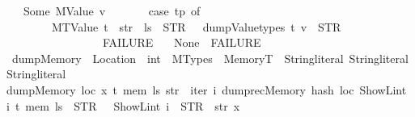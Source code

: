 \begin{isabellebody}
\ \ {\isacharbar}{\kern0pt}\ Some\ {\isacharparenleft}{\kern0pt}MValue\ v{\isacharparenright}{\kern0pt}\ {\isasymRightarrow}\isanewline
\ \ \ \ \ \ {\isacharparenleft}{\kern0pt}case\ tp\ of\isanewline
\ \ \ \ \ \ \ \ MTValue\ t\ {\isasymRightarrow}\ str\ {\isacharplus}{\kern0pt}\ ls\ {\isacharplus}{\kern0pt}\ {\isacharparenleft}{\kern0pt}STR\ {\isacharprime}{\kern0pt}{\isacharprime}{\kern0pt}{\isacharequal}{\kern0pt}{\isacharequal}{\kern0pt}{\isacharprime}{\kern0pt}{\isacharprime}{\kern0pt}{\isacharparenright}{\kern0pt}\ {\isacharplus}{\kern0pt}\ dump\isactrlsub V\isactrlsub a\isactrlsub l\isactrlsub u\isactrlsub e\isactrlsub t\isactrlsub y\isactrlsub p\isactrlsub e\isactrlsub s\ t\ v\ {\isacharplus}{\kern0pt}\ {\isacharparenleft}{\kern0pt}STR\ {\isacharprime}{\kern0pt}{\isacharprime}{\kern0pt}{\isasymnewline}{\isacharprime}{\kern0pt}{\isacharprime}{\kern0pt}{\isacharparenright}{\kern0pt}\isanewline
\ \ \ \ \ \ \ \ \ \ \ \ \ \ {\isacharbar}{\kern0pt}\ {\isacharunderscore}{\kern0pt}\ {\isasymRightarrow}\ FAILURE{\isacharparenright}{\kern0pt}\isanewline
\ \ {\isacharbar}{\kern0pt}\ None\ {\isasymRightarrow}\ FAILURE{\isacharparenright}{\kern0pt}{\isachardoublequoteclose}\isanewline
\isanewline
{}\isamarkupfalse%
\ dump\isactrlsub M\isactrlsub e\isactrlsub m\isactrlsub o\isactrlsub r\isactrlsub y\ {\isacharcolon}{\kern0pt}{\isacharcolon}{\kern0pt}\ {\isachardoublequoteopen}Location\ {\isasymRightarrow}\ int\ {\isasymRightarrow}\ MTypes\ {\isasymRightarrow}\ MemoryT\ {\isasymRightarrow}\ String{\isachardot}{\kern0pt}literal\ {\isasymRightarrow}String{\isachardot}{\kern0pt}literal\ {\isasymRightarrow}String{\isachardot}{\kern0pt}literal{\isachardoublequoteclose}\ \isanewline
{\isachardoublequoteopen}dump\isactrlsub M\isactrlsub e\isactrlsub m\isactrlsub o\isactrlsub r\isactrlsub y\ loc\ x\ t\ mem\ ls\ str\ {\isacharequal}{\kern0pt}\ iter\ {\isacharparenleft}{\kern0pt}{\isasymlambda}i{\isachardot}{\kern0pt}\ dumprec\isactrlsub M\isactrlsub e\isactrlsub m\isactrlsub o\isactrlsub r\isactrlsub y\ {\isacharparenleft}{\kern0pt}{\isacharparenleft}{\kern0pt}hash\ loc\ {\isacharparenleft}{\kern0pt}ShowL\isactrlsub i\isactrlsub n\isactrlsub t\ i{\isacharparenright}{\kern0pt}{\isacharparenright}{\kern0pt}{\isacharparenright}{\kern0pt}\ t\ mem\ {\isacharparenleft}{\kern0pt}ls\ {\isacharplus}{\kern0pt}\ STR\ {\isacharprime}{\kern0pt}{\isacharprime}{\kern0pt}{\isacharbrackleft}{\kern0pt}{\isacharprime}{\kern0pt}{\isacharprime}{\kern0pt}\ {\isacharplus}{\kern0pt}\ {\isacharparenleft}{\kern0pt}ShowL\isactrlsub i\isactrlsub n\isactrlsub t\ i\ {\isacharplus}{\kern0pt}\ STR\ {\isacharprime}{\kern0pt}{\isacharprime}{\kern0pt}{\isacharbrackright}{\kern0pt}{\isacharprime}{\kern0pt}{\isacharprime}{\kern0pt}{\isacharparenright}{\kern0pt}{\isacharparenright}{\kern0pt}{\isacharparenright}{\kern0pt}\ str\ x{\isachardoublequoteclose}%

\end{isabellebody}
